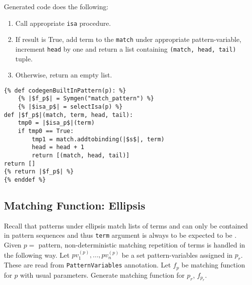 Generated code does the following:

\begin{enumerate}
\item Call appropriate \texttt{isa} procedure. 
\item If result is True, add term to the \texttt{match} under appropriate pattern-variable, increment \texttt{head} by one and return a list containing \texttt{(match, head, tail)} tuple.
\item Otherwise, return an empty list.
\end{enumerate}


\begin{verbatim}
{% def codegenBuiltInPattern(p): %}
	{% |$f_p$| = Symgen("match_pattern") %}
	{% |$isa_p$| = selectIsa(p) %}
def |$f_p$|(match, term, head, tail):
	tmp0 = |$isa_p$|(term)
	if tmp0 == True:
		tmp1 = match.addtobinding(|$s$|, term) 
		head = head + 1
		return [(match, head, tail)]
return []
{% return |$f_p$| %}
{% enddef %}

\end{verbatim}

\subsection{Matching Function: Ellipsis}
Recall that patterns under ellipsis match lists of terms and can only be contained in pattern sequences and thus \texttt{term} argument is always to be expected to be \PatternSequence. Given $p=$ \Repeat pattern, non-deterministic matching repetition of terms is handled in the following way. Let $pv_1^{(p)}, ..., pv_n^{(p)}$ be a set pattern-variables assigned in $p_r$. These are read from \texttt{PatternVariables} annotation.  Let $f_p$ be matching function for $p$ with usual parameters. Generate  matching function for $p_r$, $f_{p_r}$.

